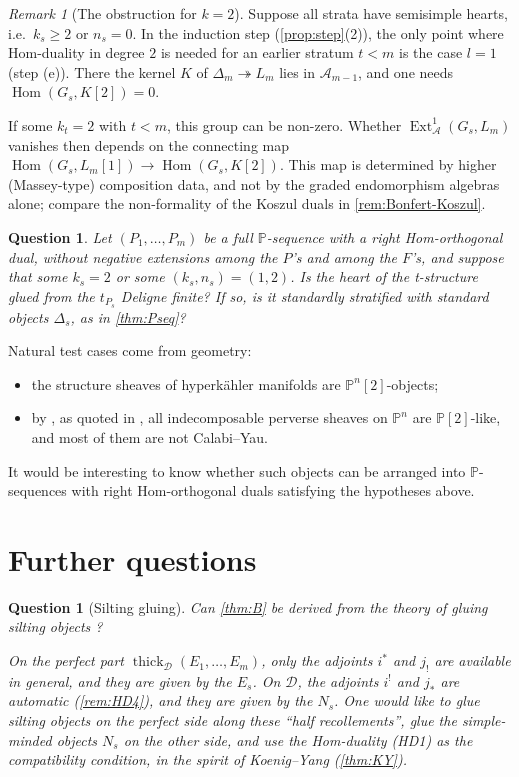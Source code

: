 \documentclass[11pt,reqno]{amsart}
\theoremstyle{plain}
\newtheorem{question}[theorem]{Question}
\theoremstyle{definition}
\theoremstyle{remark}
\newtheorem{remark}[theorem]{Remark}
\DeclareMathOperator{\Hom}{Hom}
\DeclareMathOperator{\Ext}{Ext}
\newcommand{\thick}[2][\cD]{\operatorname{thick}_{#1}(#2)}
\newcommand{\Pn}[2]{\mathbb{P}^{#1}[#2]}
\newcommand{\cD}{\mathcal{D}}
\newcommand{\cA}{\mathcal{A}}
\begin{document}
\begin{remark}[The obstruction for $k=2$]\label{rem:obstruction}
Suppose all strata have semisimple hearts, i.e.\ $k_s\ge2$ or $n_s=0$. In the induction step (\cref{prop:step}(2)), the only point where Hom-duality in degree $2$ is needed for an earlier stratum $t<m$ is the case $l=1$ (step (e)). There the kernel $K$ of $\Delta_m\twoheadrightarrow L_m$ lies in $\cA_{m-1}$, and one needs $\Hom(G_s,K[2])=0$.

If some $k_t=2$ with $t<m$, this group can be non-zero. Whether $\Ext^1_\cA(G_s,L_m)$ vanishes then depends on the connecting map $\Hom(G_s,L_m[1])\to\Hom(G_s,K[2])$. This map is determined by higher (Massey-type) composition data, and not by the graded endomorphism algebras alone; compare the non-formality of the Koszul duals in \cref{rem:Bonfert-Koszul}.
\end{remark}

\begin{question}\label{q:k2}
Let $(P_1,\dots,P_m)$ be a full $\mathbb{P}$-sequence with a right Hom-orthogonal dual, without negative extensions among the $P$'s and among the $F$'s, and suppose that some $k_s=2$ or some $(k_s,n_s)=(1,2)$. Is the heart of the t-structure glued from the $t_{P_s}$ Deligne finite? If so, is it standardly stratified with standard objects $\Delta_s$, as in \cref{thm:Pseq}?
\end{question}

Natural test cases come from geometry:
\begin{itemize}
\item the structure sheaves of hyperk\"ahler manifolds are $\Pn n2$-objects;
\item by \cite[Thm.~B]{BC25}, as quoted in \cite{Bonf26}, all indecomposable perverse sheaves on $\mathbb{P}^n$ are $\mathbb{P}[2]$-like, and most of them are not Calabi--Yau.
\end{itemize}
It would be interesting to know whether such objects can be arranged into $\mathbb{P}$-sequences with right Hom-orthogonal duals satisfying the hypotheses above.

\section{Further questions}\label{sec:questions}

\begin{question}[Silting gluing]\label{q:silting}
Can \cref{thm:B} be derived from the theory of gluing silting objects \cite{LVY14}?

On the perfect part $\thick{E_1,\dots,E_m}$, only the adjoints $i^*$ and $j_!$ are available in general, and they are given by the $E_s$. On $\cD$, the adjoints $i^!$ and $j_*$ are automatic (\cref{rem:HD4}), and they are given by the $N_s$. One would like to glue silting objects on the perfect side along these ``half recollements'', glue the simple-minded objects $N_s$ on the other side, and use the Hom-duality (HD1) as the compatibility condition, in the spirit of Koenig--Yang (\cref{thm:KY}).
\end{question}
\end{document}
